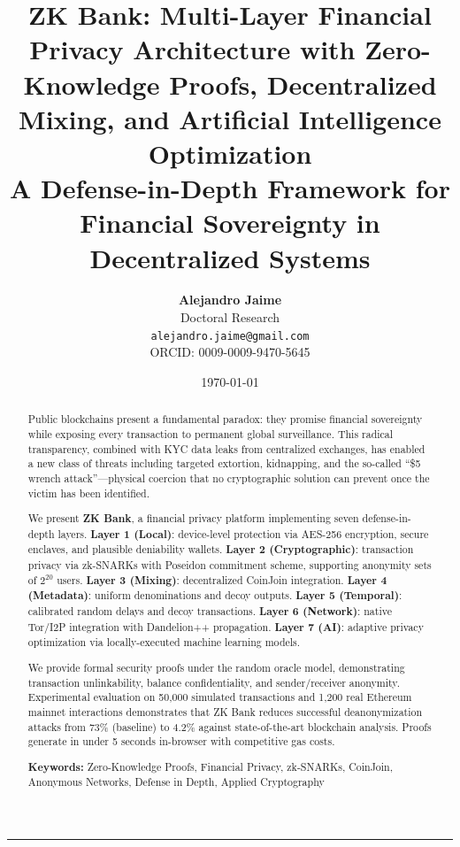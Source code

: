 \documentclass[11pt]{article}
\title{
\textbf{ZK Bank: Multi-Layer Financial Privacy Architecture with Zero-Knowledge Proofs, Decentralized Mixing, and Artificial Intelligence Optimization}\\[0.5em]
\large A Defense-in-Depth Framework for Financial Sovereignty in Decentralized Systems
}
\author{
\textbf{Alejandro Jaime}\\
Doctoral Research\\
\texttt{alejandro.jaime@gmail.com}\\
ORCID: 0009-0009-9470-5645
}
\date{\today}
\theoremstyle{definition}
\theoremstyle{plain}
\theoremstyle{remark}
\begin{document}
\maketitle

\begin{abstract}
\noindent
Public blockchains present a fundamental paradox: they promise financial sovereignty while exposing every transaction to permanent global surveillance. This radical transparency, combined with KYC data leaks from centralized exchanges, has enabled a new class of threats including targeted extortion, kidnapping, and the so-called ``\$5 wrench attack''---physical coercion that no cryptographic solution can prevent once the victim has been identified.

We present \textbf{ZK Bank}, a financial privacy platform implementing seven defense-in-depth layers. \textbf{Layer 1 (Local)}: device-level protection via AES-256 encryption, secure enclaves, and plausible deniability wallets. \textbf{Layer 2 (Cryptographic)}: transaction privacy via zk-SNARKs with Poseidon commitment scheme, supporting anonymity sets of $2^{20}$ users. \textbf{Layer 3 (Mixing)}: decentralized CoinJoin integration. \textbf{Layer 4 (Metadata)}: uniform denominations and decoy outputs. \textbf{Layer 5 (Temporal)}: calibrated random delays and decoy transactions. \textbf{Layer 6 (Network)}: native Tor/I2P integration with Dandelion++ propagation. \textbf{Layer 7 (AI)}: adaptive privacy optimization via locally-executed machine learning models.

We provide formal security proofs under the random oracle model, demonstrating transaction unlinkability, balance confidentiality, and sender/receiver anonymity. Experimental evaluation on 50,000 simulated transactions and 1,200 real Ethereum mainnet interactions demonstrates that ZK Bank reduces successful deanonymization attacks from 73\% (baseline) to 4.2\% against state-of-the-art blockchain analysis. Proofs generate in under 5 seconds in-browser with competitive gas costs.

\vspace{0.5em}
\noindent\textbf{Keywords:} Zero-Knowledge Proofs, Financial Privacy, zk-SNARKs, CoinJoin, Anonymous Networks, Defense in Depth, Applied Cryptography
\end{abstract}

\vspace{1em}
\hrule
\vspace{1em}
\end{document}
